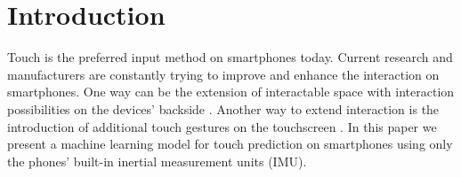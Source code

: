 \section{Introduction}
Touch is the preferred input method on smartphones today. 
Current research and manufacturers are constantly trying to improve and enhance the interaction on smartphones. 
One way can be the extension of interactable space with interaction possibilities on the devices' backside \cite{BACHELORARBEIT}.
Another way to extend interaction is the introduction of additional touch gestures on the touchscreen \cite{PALM TOUCH}.
In this paper we present a machine learning model for touch prediction on smartphones using only the phones' built-in inertial measurement units (IMU).



